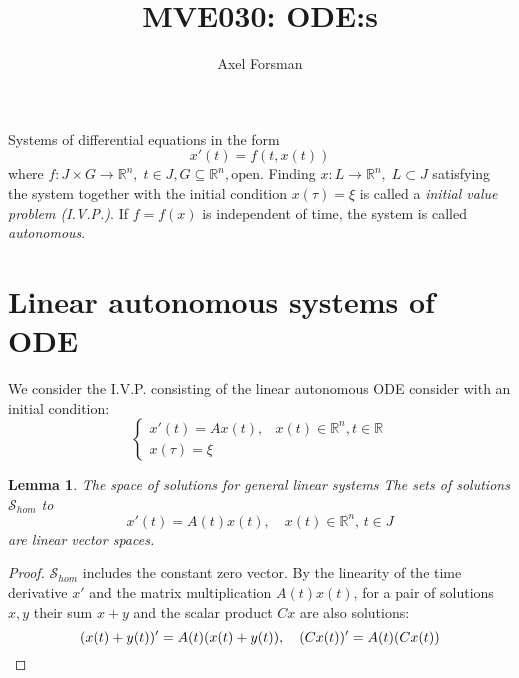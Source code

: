 \documentclass{article}
\title{MVE030: ODE:s}
\author{Axel Forsman}
\newtheorem{lemma}[theorem]{Lemma}
\begin{document}
\maketitle

Systems of differential equations in the form
$$ x'(t) = f(t, x(t)) $$
where $f : J \times G \to \mathbb R^n, \; t \in J, G \subseteq \mathbb R^n, \text{open}$.
Finding $x : L \to \mathbb R^n, \; L \subset J$ satisfying the system
together with the initial condition $x(\tau) = \xi$ is called a
\emph{initial value problem (I.V.P.)}.
If $f = f(x)$ is independent of time, the system is called \emph{autonomous}.

\section{Linear autonomous systems of ODE}
We consider the I.V.P. consisting of the
linear autonomous ODE consider with an initial condition:
\begin{equation}\label{eq:ivp}
	\left\{ \begin{array}{ll}
		x'(t) = A x(t), & x(t) \in \mathbb R^n, t \in \mathbb R \\
		x(\tau) = \xi
	\end{array} \right.
\end{equation}

\begin{lemma}{The space of solutions for general linear systems}
	The sets of solutions $\mathcal S_{hom}$ to
	$$ x'(t) = A(t) x(t), \quad x(t) \in \mathbb R^n, \, t \in J $$
	are linear vector spaces.
\end{lemma}
\begin{proof}
	$\mathcal S_{hom}$ includes the constant zero vector.
	By the linearity of the time derivative $x'$ and the matrix multiplication $A(t)x(t)$,
	for a pair of solutions $x, y$ their sum $x + y$ and the scalar product $Cx$ are also solutions:
	$$ (x(t) + y(t))' = A(t) (x(t) + y(t)), \quad (Cx(t))' = A(t)(Cx(t)) \qedhere $$
\end{proof}
\end{document}
